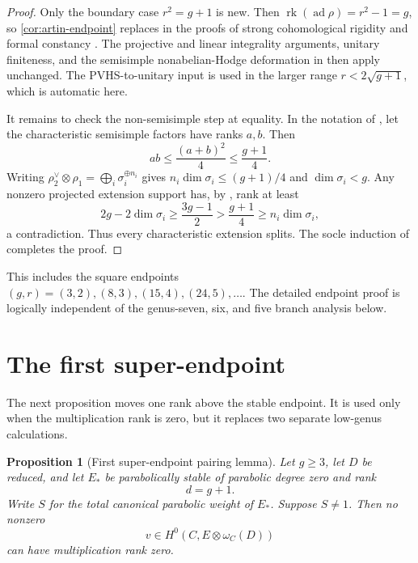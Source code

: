 \documentclass[11pt]{article}
\newtheorem{proposition}[theorem]{Proposition}
\theoremstyle{definition}
\newcommand{\rk}{\operatorname{rk}}
\newcommand{\ad}{\operatorname{ad}}
\begin{document}
\begin{proof}
Only the boundary case $r^2=g+1$ is new.  Then
$\rk(\ad\rho)=r^2-1=g$, so \cref{cor:artin-endpoint} replaces
\cite[Theorem 6.2.1]{LLCan} in the proofs of strong cohomological rigidity
\cite[Proposition 8.2.1]{LLCan} and formal constancy
\cite[Lemma 8.5.1]{LLCan}.  The projective and linear integrality arguments,
unitary finiteness, and the semisimple nonabelian-Hodge deformation in
\cite[Sections 8.3--8.5]{LLCan} then apply unchanged.  The PVHS-to-unitary
input is used in the larger range $r<2\sqrt{g+1}$, which is automatic here.

It remains to check the non-semisimple step at equality.  In the notation of
\cite[Lemma 8.6.1]{LLCan}, let the characteristic semisimple factors have
ranks $a,b$.  Then
\[
 ab\le\frac{(a+b)^2}{4}\le\frac{g+1}{4}.
\]
Writing
$\rho_2^\vee\otimes\rho_1=\bigoplus_i\sigma_i^{\oplus n_i}$ gives
$n_i\dim\sigma_i\le(g+1)/4$ and $\dim\sigma_i<g$.  Any nonzero projected
extension support has, by \cite[Theorem 7.2.1]{LLCan}, rank at least
\[
 2g-2\dim\sigma_i
 \ge\frac{3g-1}{2}
 >\frac{g+1}{4}
 \ge n_i\dim\sigma_i,
\]
a contradiction.  Thus every characteristic extension splits.  The socle
induction of \cite[Section 8.7]{LLCan} completes the proof.
\end{proof}

This includes the square endpoints $(g,r)=(3,2),(8,3),(15,4),(24,5),\ldots$.
The detailed endpoint proof is logically independent of the genus-seven,
six, and five branch analysis below.

\section{The first super-endpoint}\label{sec:first-super}

The next proposition moves one rank above the stable endpoint.  It is used
only when the multiplication rank is zero, but it replaces two separate
low-genus calculations.

\begin{proposition}[First super-endpoint pairing lemma]
\label{prop:first-super}
Let $g\ge3$, let $D$ be reduced, and let $E_*$ be parabolically stable of
parabolic degree zero and rank
\[
 d=g+1.
\]
Write $S$ for the total canonical parabolic weight of $E_*$.  Suppose
$S\ne1$.  Then no nonzero
\[
 v\in H^0(C,E\otimes\omega_C(D))
\]
can have multiplication rank zero.
\end{proposition}
\end{document}
